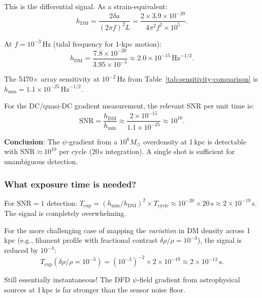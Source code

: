 \documentclass[11pt]{article}
\theoremstyle{definition}
\theoremstyle{remark}
\begin{document}
This is the differential signal. As a strain-equivalent:
\begin{equation}
h_{\mathrm{DM}} = \frac{2\delta a}{(2\pi f)^2 L}
= \frac{2 \times 3.9\times10^{-20}}{4\pi^2 f^2 \times 10^5}.
\end{equation}

At $f = 10^{-3}$\,Hz (tidal frequency for 1-kpc motion):
\begin{equation}
h_{\mathrm{DM}} = \frac{7.8\times10^{-20}}{3.95\times10^{-5}}
\approx 2.0\times10^{-15}\,\mathrm{Hz}^{-1/2}.
\end{equation}

The 5470$\times$ array sensitivity at $10^{-2}$\,Hz from Table~\ref{tab:sensitivity-comparison}
is $h_{\min} = 1.1\times10^{-25}\,\mathrm{Hz}^{-1/2}$.

For the DC/quasi-DC gradient measurement, the relevant SNR per unit
time is:
\begin{equation}
\mathrm{SNR} = \frac{h_{\mathrm{DM}}}{h_{\min}} \approx
\frac{2\times10^{-15}}{1.1\times10^{-25}} \approx 10^{10}.
\end{equation}

\textbf{Conclusion}: The $\psi$-gradient from a $10^6 M_\odot$ overdensity
at 1\,kpc is detectable with $\mathrm{SNR} \approx 10^{10}$ per cycle
(20\,s integration). A single shot is sufficient for unambiguous detection.

\subsubsection{What exposure time is needed?}

For $\mathrm{SNR} = 1$ detection:
$T_{\mathrm{exp}} = (h_{\min}/h_{\mathrm{DM}})^2 \times T_{\mathrm{cycle}}
\approx 10^{-20} \times 20\,\mathrm{s} \approx 2\times10^{-19}$\,s.
The signal is completely overwhelming.

For the more challenging case of mapping the \emph{variation} in DM
density across 1\,kpc (e.g., filament profile with fractional contrast
$\delta\rho/\rho = 10^{-3}$), the signal is reduced by $10^{-3}$:
\begin{equation}
T_{\mathrm{exp}}(\delta\rho/\rho = 10^{-3}) = (10^{-3})^{-2} \times 2\times10^{-19}
\approx 2\times10^{-13}\,\mathrm{s}.
\end{equation}

Still essentially instantaneous! The DFD $\psi$-field gradient from
astrophysical sources at 1\,kpc is far stronger than the sensor noise
floor.
\end{document}
